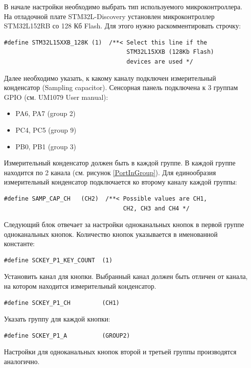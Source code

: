 	В начале настройки необходимо выбрать тип используемого микроконтроллера. На отладочной плате STM32L-Discovery установлен микроконтроллер STM32L152RB со 128 Кб Flash. Для этого нужно раскомментировать строчку:
\begin{verbatim}
#define STM32L15XXB_128K (1)  /**< Select this line if the 
                                   STM32L15XXB (128Kb Flash) 
                                   devices are used */
\end{verbatim}
Далее необходимо указать, к какому каналу подключен измерительный конденсатор (Sampling capacitor). Сенсорная панель подключена к 3 группам GPIO (см. UM1079 User manual):
\begin{itemize}
\item PA6, PA7 (group 2)
\item PC4, PC5 (group 9)
\item PB0, PB1 (group 3)
\end{itemize}
Измерительный конденсатор должен быть в каждой группе. В каждой группе находится по 2 канала (см. рисунок \ref{PortInGroup}). Для единообразия измерительный конденсатор подключается ко второму каналу каждой группы:
\begin{verbatim}
#define SAMP_CAP_CH   (CH2)  /**< Possible values are CH1, 
                                  CH2, CH3 and CH4 */
\end{verbatim}
Следующий блок отвечает за настройки одноканальных кнопок в первой группе одноканальных кнопок. Количество кнопок указывается в именованной константе:
\begin{verbatim}
#define SCKEY_P1_KEY_COUNT  (1)
\end{verbatim}
Установить канал для кнопки. Выбранный канал должен быть отличен от канала, на котором находится измерительный конденсатор.
\begin{verbatim}
#define SCKEY_P1_CH         (CH1)
\end{verbatim}
Указать группу для каждой кнопки:
\begin{verbatim}
#define SCKEY_P1_A          (GROUP2)
\end{verbatim}
Настройки для одноканальных кнопок второй и третьей группы производятся аналогично. 


